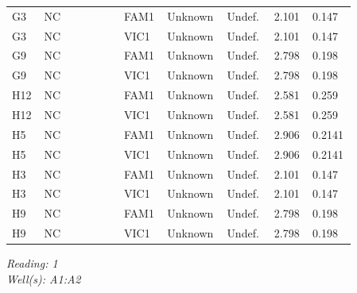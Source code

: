 \documentclass[UTF8,10pt,a4paper,fontset=fandol]{ctexart}
\begin{document}
\begin{center}
\begin{tabular}{p{0.08\linewidth}p{0.22\linewidth}p{0.10\linewidth}p{0.13\linewidth}p{0.13\linewidth}p{0.10\linewidth}p{0.10\linewidth}}
G3 & NC & FAM1 & Unknown & Undef. & 2.101 & 0.147\\
G3 & NC & VIC1 & Unknown & Undef. & 2.101 & 0.147\\
G9 & NC & FAM1 & Unknown & Undef. & 2.798 & 0.198\\
G9 & NC & VIC1 & Unknown & Undef. & 2.798 & 0.198\\
H12 & NC & FAM1 & Unknown & Undef. & 2.581 & 0.259\\
H12 & NC & VIC1 & Unknown & Undef. & 2.581 & 0.259\\
H5 & NC & FAM1 & Unknown & Undef. & 2.906 & 0.2141\\
H5 & NC & VIC1 & Unknown & Undef. & 2.906 & 0.2141\\
H3 & NC & FAM1 & Unknown & Undef. & 2.101 & 0.147\\
H3 & NC & VIC1 & Unknown & Undef. & 2.101 & 0.147\\
H9 & NC & FAM1 & Unknown & Undef. & 2.798 & 0.198\\
H9 & NC & VIC1 & Unknown & Undef. & 2.798 & 0.198\\
\end{tabular}
\end{center}

\newpage

\begin{center}
\textit{Reading: 1}\\
\textit{Well(s): A1:A2}
\end{center}
\end{document}
